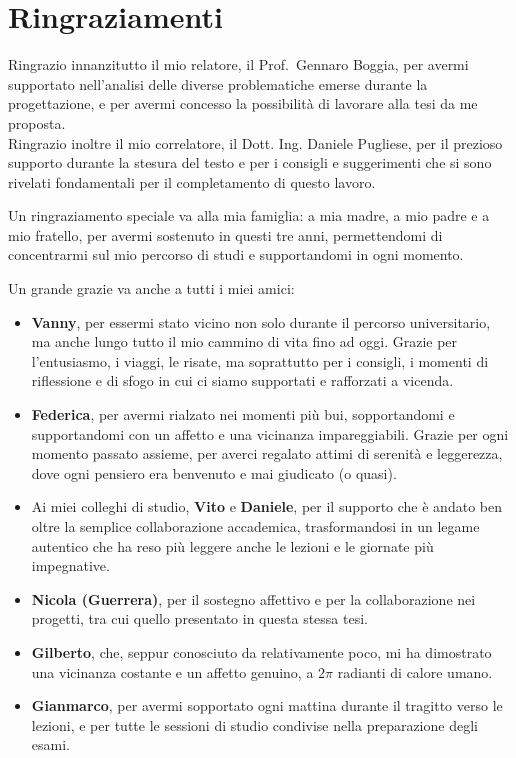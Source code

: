 \chapter*{Ringraziamenti}

Ringrazio innanzitutto il mio relatore, il Prof.\ Gennaro Boggia, per avermi supportato nell’analisi delle diverse problematiche emerse durante la progettazione, e per avermi concesso la possibilità di lavorare alla tesi da me proposta. \\
Ringrazio inoltre il mio correlatore, il Dott. Ing. Daniele Pugliese, per il prezioso supporto durante la stesura del testo e per i consigli e suggerimenti che si sono rivelati fondamentali per il completamento di questo lavoro.

\vspace{1em}
Un ringraziamento speciale va alla mia famiglia: a mia madre, a mio padre e a mio fratello, per avermi sostenuto in questi tre anni, permettendomi di concentrarmi sul mio percorso di studi e supportandomi in ogni momento.

\vspace{1em}
Un grande grazie va anche a tutti i miei amici:
\begin{itemize}
    \item \textbf{Vanny}, per essermi stato vicino non solo durante il percorso universitario, ma anche lungo tutto il mio cammino di vita fino ad oggi. Grazie per l’entusiasmo, i viaggi, le risate, ma soprattutto per i consigli, i momenti di riflessione e di sfogo in cui ci siamo supportati e rafforzati a vicenda.
    \item \textbf{Federica}, per avermi rialzato nei momenti più bui, sopportandomi e supportandomi con un affetto e una vicinanza impareggiabili. Grazie per ogni momento passato assieme, per averci regalato attimi di serenità e leggerezza, dove ogni pensiero era benvenuto e mai giudicato (o quasi).
    \item Ai miei colleghi di studio, \textbf{Vito} e \textbf{Daniele}, per il supporto che è andato ben oltre la semplice collaborazione accademica, trasformandosi in un legame autentico che ha reso più leggere anche le lezioni e le giornate più impegnative.
    \item \textbf{Nicola (Guerrera)}, per il sostegno affettivo e per la collaborazione nei progetti, tra cui quello presentato in questa stessa tesi.
    \item \textbf{Gilberto}, che, seppur conosciuto da relativamente poco, mi ha dimostrato una vicinanza costante e un affetto genuino, a $2\pi$ radianti di calore umano.
    \item \textbf{Gianmarco}, per avermi sopportato ogni mattina durante il tragitto verso le lezioni, e per tutte le sessioni di studio condivise nella preparazione degli esami.
\end{itemize}

